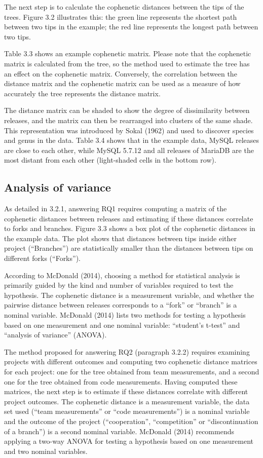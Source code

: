 The next step is to calculate the cophenetic distances between the tips of the trees. Figure 3.2 illustrates this: the green line represents the shortest path between two tips in the example; the red line represents the longest path between two tips.

Table 3.3 shows an example cophenetic matrix. Please note that the cophenetic matrix is calculated from the tree, so the method used to estimate the tree has an effect on the cophenetic matrix. Conversely, the correlation between the distance matrix and the cophenetic matrix can be used as a measure of how accurately the tree represents the distance matrix.

The distance matrix can be shaded to show the degree of dissimilarity between releases, and the matrix can then be rearranged into clusters of the same shade. This representation was introduced by Sokal (1962) and used to discover species and genus in the data. Table 3.4 shows that in the example data, MySQL releases are close to each other, while MySQL 5.7.12 and all releases of MariaDB are the most distant from each other (light-shaded cells in the bottom row).

\subsection{Analysis of variance}
As detailed in 3.2.1, answering RQ1 requires computing a matrix of the cophenetic distances between releases and estimating if these distances correlate to forks and branches. Figure 3.3 shows a box plot of the cophenetic distances in the example data. The plot shows that distances between tips inside either project (“Branches”) are statistically smaller than the distances between tips on different forks (“Forks”).

According to McDonald (2014), choosing a method for statistical analysis is primarily guided by the kind and number of variables required to test the hypothesis. The cophenetic distance is a measurement variable, and whether the pairwise distance between releases corresponds to a “fork” or “branch” is a nominal variable. McDonald (2014) lists two methods for testing a hypothesis based on one measurement and one nominal variable: “student's t-test” and “analysis of variance” (ANOVA).

The method proposed for answering RQ2 (paragraph 3.2.2) requires examining projects with different outcomes and computing two cophenetic distance matrices for each project: one for the tree obtained from team measurements, and a second one for the tree obtained from code measurements. Having computed these matrices, the next step is to estimate if these distances correlate with different project outcomes. The cophenetic distance is a measurement variable, the data set used (“team measurements” or “code measurements”) is a nominal variable and the outcome of the project (“cooperation”, “competition” or “discontinuation of a branch”) is a second nominal variable. McDonald (2014) recommends applying a two-way ANOVA for testing a hypothesis based on one measurement and two nominal variables.

